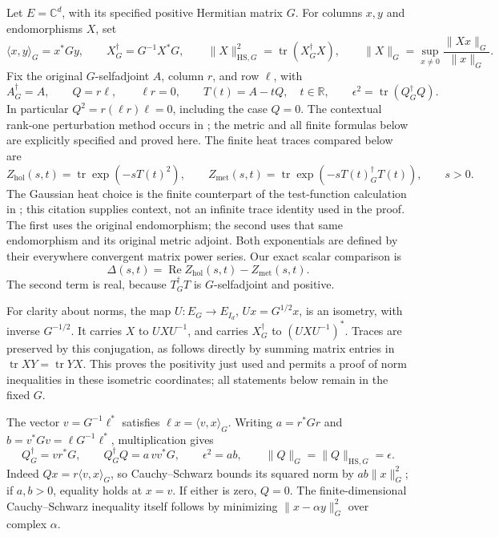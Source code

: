 \documentclass[11pt]{article}
\newcommand{\tr}{\operatorname{tr}}
\newcommand{\adj}{\dagger_G}
\newcommand{\Rea}{\operatorname{Re}}
\begin{document}
Let \(E=\mathbb C^d\), with its specified positive Hermitian matrix \(G\).
For columns \(x,y\) and endomorphisms \(X\), set
\begin{equation}
 \langle x,y\rangle_G=x^*Gy,\qquad
 X^\adj=G^{-1}X^*G,\qquad
 \|X\|_{\mathrm{HS},G}^2=\tr(X^\adj X),\qquad
 \|X\|_G=\sup_{x\ne0}\frac{\|Xx\|_G}{\|x\|_G}.
 \tag{HM1}\label{HM1}
\end{equation}
Fix the original \(G\)-selfadjoint \(A\), column \(r\), and row \(\ell\), with
\begin{equation}
 A^\adj=A,\qquad Q=r\ell,\qquad \ell r=0,\qquad
 T(t)=A-tQ,\quad t\in\mathbb R,\qquad
 \epsilon^2=\tr(Q^\adj Q).
 \tag{HM2}\label{HM2}
\end{equation}
In particular \(Q^2=r(\ell r)\ell=0\), including the case \(Q=0\).
The contextual rank-one perturbation method occurs in
\cite[original-source Section \texttt{sect:sa}]{ConnesSuijlekom};
the metric and all finite formulas below are explicitly specified and proved here.
The finite heat traces compared below are
\begin{equation}
 Z_{\mathrm{hol}}(s,t)=\tr\exp(-sT(t)^2),\qquad
 Z_{\mathrm{met}}(s,t)=\tr\exp(-sT(t)^\adj T(t)),\qquad s>0.
 \tag{HM3}\label{HM3}
\end{equation}
The Gaussian heat choice is the finite counterpart of the test-function
calculation in \cite[original-source formula \texttt{ft}]{ConnesHeat};
this citation supplies context, not an infinite trace identity used in the proof.
The first uses the original endomorphism; the second uses that same
endomorphism and its original metric adjoint. Both exponentials are defined
by their everywhere convergent matrix power series. Our exact scalar comparison is
\begin{equation}
 \Delta(s,t)=\Rea Z_{\mathrm{hol}}(s,t)-Z_{\mathrm{met}}(s,t).
 \tag{HM4}\label{HM4}
\end{equation}
The second term is real, because \(T^\adj T\) is \(G\)-selfadjoint and positive.

For clarity about norms, the map \(U:E_G\longrightarrow E_{I_d}\),
\(Ux=G^{1/2}x\), is an isometry, with inverse \(G^{-1/2}\).
It carries \(X\) to \(UXU^{-1}\), and carries \(X^\adj\) to
\((UXU^{-1})^*\). Traces are preserved by this conjugation, as follows
directly by summing matrix entries in \(\tr XY=\tr YX\).
This proves the positivity just used and permits a proof of norm inequalities
in these isometric coordinates; all statements below remain in the fixed \(G\).

The vector \(v=G^{-1}\ell^*\) satisfies \(\ell x=\langle v,x\rangle_G\).
Writing \(a=r^*Gr\) and \(b=v^*Gv=\ell G^{-1}\ell^*\), multiplication gives
\begin{equation}
 Q^\adj=vr^*G,\qquad Q^\adj Q=a\,vv^*G,\qquad
 \epsilon^2=ab,\qquad
 \|Q\|_G=\|Q\|_{\mathrm{HS},G}=\epsilon.
 \tag{HM5}\label{HM5}
\end{equation}
Indeed \(Qx=r\langle v,x\rangle_G\), so Cauchy--Schwarz bounds its squared
norm by \(ab\|x\|_G^2\); if \(a,b>0\), equality holds at \(x=v\).
If either is zero, \(Q=0\). The finite-dimensional Cauchy--Schwarz inequality
itself follows by minimizing \(\|x-\alpha y\|_G^2\) over complex \(\alpha\).
\end{document}
